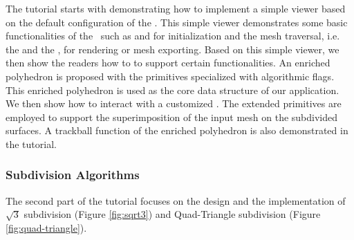 \documentclass[letter,twocolumn]{article}
\begin{document}

The tutorial starts with demonstrating how to implement a simple
viewer based on the default configuration of the \cgalpoly . This
simple viewer demonstrates some basic functionalities of the
\cgalpoly\ such as  and  
for initialization and the mesh traversal, i.e. the 
and the , for rendering or mesh exporting. Based
on this simple viewer, we then show the readers how to
 to support certain functionalities. 
An enriched polyhedron is proposed with the primitives specialized
with algorithmic flags. This enriched polyhedron is used as the core
data structure of our application.  We then show how to interact with
a customized \poly.  The extended primitives are employed to support
the superimposition of the input mesh on the subdivided surfaces. A
trackball function of the enriched polyhedron is also demonstrated in
the tutorial.

\subsubsection*{Subdivision Algorithms}

The second part of the tutorial focuses on the design and the
implementation of $\sqrt{3}$ subdivision (Figure \ref{fig:sqrt3}) 
and Quad-Triangle subdivision (Figure \ref{fig:quad-triangle}).  
\end{document}
